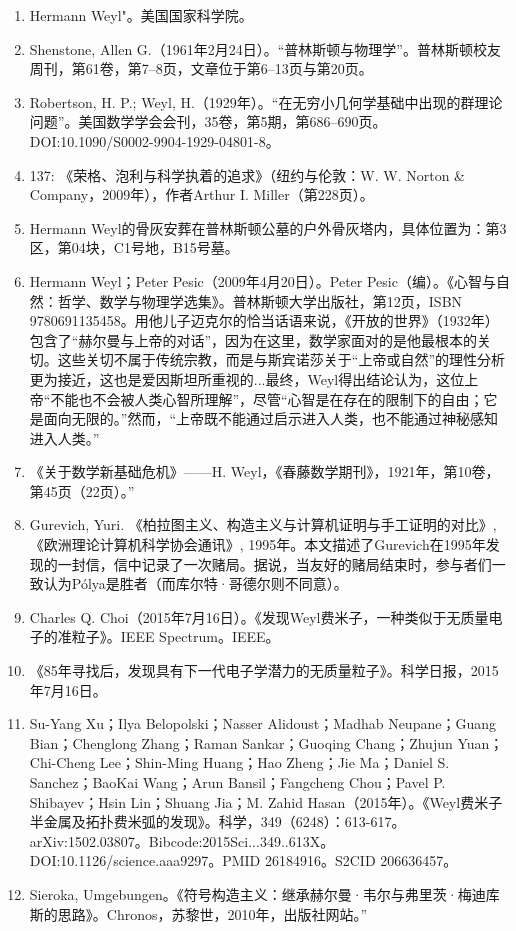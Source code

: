 \begin{enumerate}
\item Hermann Weyl"。美国国家科学院。
\item Shenstone, Allen G.（1961年2月24日）。“普林斯顿与物理学”。普林斯顿校友周刊，第61卷，第7–8页，文章位于第6–13页与第20页。
\item Robertson, H. P.; Weyl, H.（1929年）。“在无穷小几何学基础中出现的群理论问题”。美国数学学会会刊，35卷，第5期，第686–690页。DOI:10.1090/S0002-9904-1929-04801-8。
\item 137: 《荣格、泡利与科学执着的追求》（纽约与伦敦：W. W. Norton & Company，2009年），作者Arthur I. Miller（第228页）。
\item Hermann Weyl的骨灰安葬在普林斯顿公墓的户外骨灰塔内，具体位置为：第3区，第04块，C1号地，B15号墓。
\item Hermann Weyl；Peter Pesic（2009年4月20日）。Peter Pesic（编）。《心智与自然：哲学、数学与物理学选集》。普林斯顿大学出版社，第12页，ISBN 9780691135458。用他儿子迈克尔的恰当话语来说，《开放的世界》（1932年）包含了“赫尔曼与上帝的对话”，因为在这里，数学家面对的是他最根本的关切。这些关切不属于传统宗教，而是与斯宾诺莎关于“上帝或自然”的理性分析更为接近，这也是爱因斯坦所重视的...最终，Weyl得出结论认为，这位上帝“不能也不会被人类心智所理解”，尽管“心智是在存在的限制下的自由；它是面向无限的。”然而，“上帝既不能通过启示进入人类，也不能通过神秘感知进入人类。”
\item 《关于数学新基础危机》——H. Weyl，《春藤数学期刊》，1921年，第10卷，第45页（22页）。”
\item Gurevich, Yuri. 《柏拉图主义、构造主义与计算机证明与手工证明的对比》, 《欧洲理论计算机科学协会通讯》, 1995年。本文描述了Gurevich在1995年发现的一封信，信中记录了一次赌局。据说，当友好的赌局结束时，参与者们一致认为Pólya是胜者（而库尔特·哥德尔则不同意）。
\item Charles Q. Choi（2015年7月16日）。《发现Weyl费米子，一种类似于无质量电子的准粒子》。IEEE Spectrum。IEEE。
\item 《85年寻找后，发现具有下一代电子学潜力的无质量粒子》。科学日报，2015年7月16日。
\item Su-Yang Xu；Ilya Belopolski；Nasser Alidoust；Madhab Neupane；Guang Bian；Chenglong Zhang；Raman Sankar；Guoqing Chang；Zhujun Yuan；Chi-Cheng Lee；Shin-Ming Huang；Hao Zheng；Jie Ma；Daniel S. Sanchez；BaoKai Wang；Arun Bansil；Fangcheng Chou；Pavel P. Shibayev；Hsin Lin；Shuang Jia；M. Zahid Hasan（2015年）。《Weyl费米子半金属及拓扑费米弧的发现》。科学，349（6248）：613-617。arXiv:1502.03807。Bibcode:2015Sci...349..613X。DOI:10.1126/science.aaa9297。PMID 26184916。S2CID 206636457。
\item Sieroka, Umgebungen。《符号构造主义：继承赫尔曼·韦尔与弗里茨·梅迪库斯的思路》。Chronos，苏黎世，2010年，出版社网站。”

\end{enumerate}

